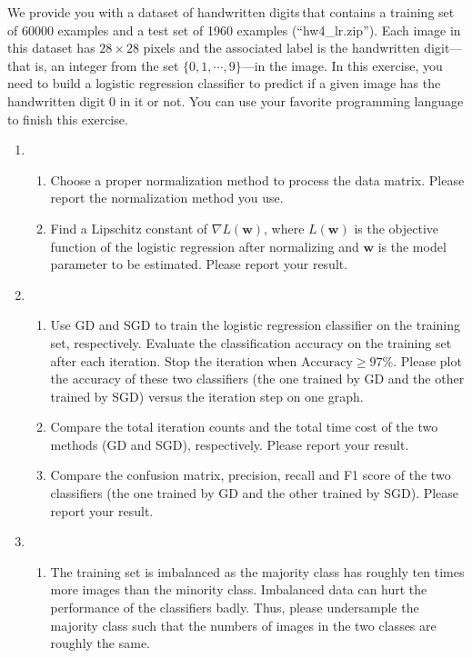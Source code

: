\documentclass[11pt,letter,notitlepage]{article}
\begin{document}
\begin{exercise}

We provide you with a dataset of handwritten digits\footnotemark\,that contains a training set of 60000 examples and a test set of 1960 examples (``hw4\_lr.zip''). Each image in this dataset  has $28\times28$ pixels and the associated label is the handwritten digit---that is, an integer from the set $\{0,1,\cdots,9\}$---in the image. In this exercise, you need to build a logistic regression classifier to predict if a given image has the handwritten digit $0$ in it or not. You can use your favorite programming language to finish this exercise.
\begin{enumerate}
\item
\begin{enumerate}
    \item Choose a proper normalization method to process the data matrix. Please report the normalization method you use.
    \item Find a Lipschitz constant of $\nabla L(\mathbf{w})$, where $L(\mathbf{w})$ is the objective function of the logistic regression after normalizing and  $\mathbf{w}$ is the model parameter to be estimated. Please report your result.
\end{enumerate}
\item
\begin{enumerate}
    \item Use GD and SGD to train the logistic regression classifier on the training set, respectively. Evaluate the classification accuracy on the training set after each iteration. Stop the iteration when $\text{Accuracy}\geq 97\%$. Please plot the accuracy of these two classifiers (the one trained by GD and the other trained by SGD) versus the iteration step on one graph.
    \item Compare the total iteration counts and the total time cost of the two methods (GD and SGD), respectively. Please report your result.
    \item Compare the confusion matrix, precision, recall and F1 score of the two classifiers (the one trained by GD and the other trained by SGD). Please report your result.
\end{enumerate}
\item 
\begin{enumerate}
    \item The training set is imbalanced as the majority class has roughly ten times more images than the minority class. Imbalanced data can hurt the performance of the classifiers badly. Thus, please undersample the majority class such that the numbers of images in the two classes are roughly the same. 

\end{enumerate}
\end{enumerate}
\end{exercise}
\end{document}
